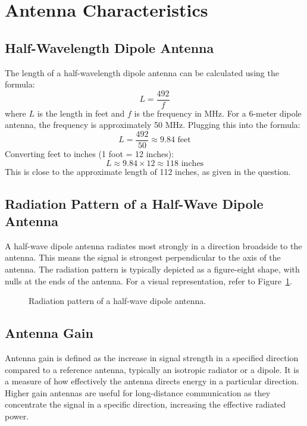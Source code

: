 \section{Antenna Characteristics}
\label{section:antenna_characteristics}

\subsection*{Half-Wavelength Dipole Antenna}
The length of a half-wavelength dipole antenna can be calculated using the formula:
\begin{equation}
L = \frac{492}{f}
\end{equation}
where \( L \) is the length in feet and \( f \) is the frequency in MHz. For a 6-meter dipole antenna, the frequency is approximately 50 MHz. Plugging this into the formula:
\begin{equation}
L = \frac{492}{50} \approx 9.84 \text{ feet}
\end{equation}
Converting feet to inches (1 foot = 12 inches):
\begin{equation}
L \approx 9.84 \times 12 \approx 118 \text{ inches}
\end{equation}
This is close to the approximate length of 112 inches, as given in the question.

\subsection*{Radiation Pattern of a Half-Wave Dipole Antenna}
A half-wave dipole antenna radiates most strongly in a direction broadside to the antenna. This means the signal is strongest perpendicular to the axis of the antenna. The radiation pattern is typically depicted as a figure-eight shape, with nulls at the ends of the antenna. For a visual representation, refer to Figure~\ref{fig:dipole_radiation}.

\begin{figure}[h!]
    \centering
    \caption{Radiation pattern of a half-wave dipole antenna.}
    \label{fig:dipole_radiation}
\end{figure}

\subsection*{Antenna Gain}
Antenna gain is defined as the increase in signal strength in a specified direction compared to a reference antenna, typically an isotropic radiator or a dipole. It is a measure of how effectively the antenna directs energy in a particular direction. Higher gain antennas are useful for long-distance communication as they concentrate the signal in a specific direction, increasing the effective radiated power.

